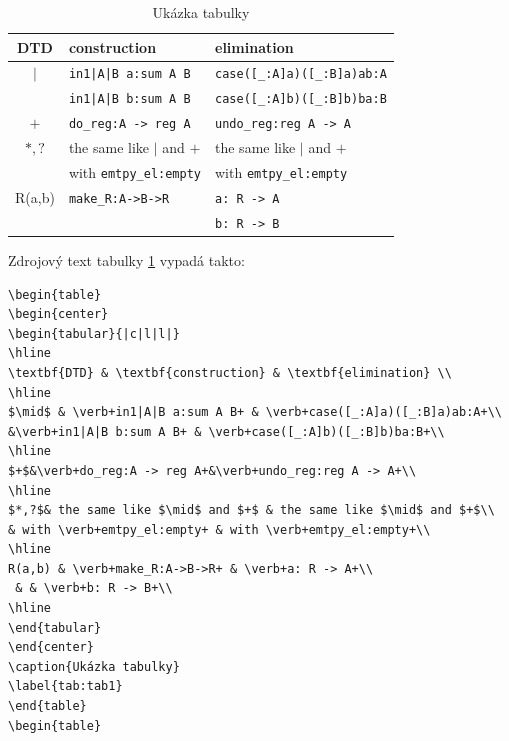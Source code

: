 \documentclass[11pt,oneside,a4paper]{book}
\begin{document}
\begin{table}
\begin{center}
\begin{tabular}{|c|l|l|}
\hline
\textbf{DTD} & \textbf{construction} & \textbf{elimination} \\
\hline
$\mid$ & \verb+in1|A|B a:sum A B+ & \verb+case([_:A]a)([_:B]a)ab:A+\\
&\verb+in1|A|B b:sum A B+ & \verb+case([_:A]b)([_:B]b)ba:B+\\
\hline
$+$&\verb+do_reg:A -> reg A+&\verb+undo_reg:reg A -> A+\\
\hline
$*,?$& the same like $\mid$ and $+$ & the same like $\mid$ and $+$\\
& with \verb+emtpy_el:empty+ & with \verb+emtpy_el:empty+\\
\hline
R(a,b) & \verb+make_R:A->B->R+ & \verb+a: R -> A+\\
 & & \verb+b: R -> B+\\
\hline
\end{tabular}
\end{center}
\caption{Ukázka tabulky}
\label{tab:tab1}
\end{table}

Zdrojový text tabulky \ref{tab:tab1} vypadá takto:
\begin{verbatim}
\begin{table}
\begin{center}
\begin{tabular}{|c|l|l|}
\hline
\textbf{DTD} & \textbf{construction} & \textbf{elimination} \\
\hline
$\mid$ & \verb+in1|A|B a:sum A B+ & \verb+case([_:A]a)([_:B]a)ab:A+\\
&\verb+in1|A|B b:sum A B+ & \verb+case([_:A]b)([_:B]b)ba:B+\\
\hline
$+$&\verb+do_reg:A -> reg A+&\verb+undo_reg:reg A -> A+\\
\hline
$*,?$& the same like $\mid$ and $+$ & the same like $\mid$ and $+$\\
& with \verb+emtpy_el:empty+ & with \verb+emtpy_el:empty+\\
\hline
R(a,b) & \verb+make_R:A->B->R+ & \verb+a: R -> A+\\
 & & \verb+b: R -> B+\\
\hline
\end{tabular}
\end{center}
\caption{Ukázka tabulky}
\label{tab:tab1}
\end{table}
\begin{table}
\end{verbatim}
\end{document}
